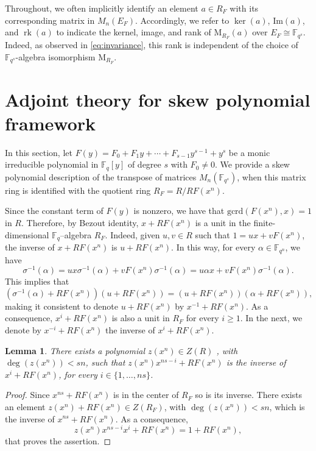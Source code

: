 \documentclass[a4paper, 11pt]{article}
\DeclareMathOperator{\rk}{rk}
\newtheorem{lemma}[theorem]{Lemma}
\newcommand{\F}{{\mathbb F}}
\newcommand{\gcrd}{\mathrm{gcrd}}
\newcommand{\Ima}{\mathrm{Im}}
\newcommand{\M}{\mathrm{M}}
\begin{document}
Throughout, we often implicitly identify an element $a \in R_F$ with its corresponding matrix in $M_n(E_F)$. Accordingly, we refer to $\ker(a)$, $\Ima(a)$, and $\rk(a)$ to indicate the kernel, image, and rank of $\M_{R_F}(a)$ over $E_F \cong \F_{q^s}$. Indeed, as observed in \eqref{eq:invariance}, this rank is independent of the choice of $\F_{q^s}$-algebra isomorphism $\M_{R_F}$.






\section{Adjoint theory for skew polynomial framework} \label{sec:adjoint}

In this section, let $F(y) = F_0 + F_1 y + \cdots + F_{s-1} y^{s-1} + y^s$ be  a monic irreducible polynomial in $\F_q[y]$ of degree $s$ with \(F_0 \neq 0\). We provide a skew polynomial description of the transpose of matrices $M_n(\F_{q^s})$, when this matrix ring is identified with the quotient ring $R_F = R/RF(x^n)$. 


Since the constant term of $F(y)$ is nonzero, we have that $\gcrd(F(x^n), x) = 1$ in $R$. Therefore, by Bezout identity, $x + R F(x^n)$ is a unit in the finite-dimensional \(\F_q\)--algebra $R_F$. Indeed, given \(u, v \in R\) such that \(1 = ux + vF(x^n)\), the inverse of \(x + RF(x^n)\) is \(u + RF(x^n)\). In this way, for every \(\alpha \in \F_{q^n}\), we have
\[
\sigma^{-1}(\alpha) = ux\sigma^{-1}(\alpha) + v F(x^n) \sigma^{-1}(\alpha) = u \alpha x + vF(x^n)\sigma^{-1}(\alpha).
\]
This implies that 
\begin{equation}\label{inverso}
(\sigma^{-1}(\alpha)+RF(x^n)) (u + RF(x^n)) = (u + RF(x^n))(\alpha + RF(x^n)),
\end{equation}
making it consistent to denote \(u + RF(x^n)\) by \(x^{-1} + RF(x^n)\). As a consequence, $x^i + R F(x^n)$ is also a unit in $R_F$ for every $i \geq 1$. In the next, we denote by $x^{-i}+RF(x^n)$ the inverse of $x^i+RF(x^n)$.

\begin{lemma} \label{lm:inverseofx}
    There exists a polynomial $z(x^n) \in Z(R)$ , with $\deg(z(x^n))<sn$, such that $z(x^n)x^{ns-i}+RF(x^n)$ is the inverse of $x^i+RF(x^n)$, for every $i \in \{1,\ldots,ns\}$.
\end{lemma}

\begin{proof}
    Since \(x^{ns} + RF(x^n)\) is in the center of \(R_F\) so is its inverse. There exists an element $z(x^n)+RF(x^n) \in Z(R_F)$, with $\deg(z(x^n))<sn$, which is the inverse of $x^{ns}+RF(x^n)$. As a consequence, 
    \[
    z(x^n)x^{ns-i}x^i+RF(x^n)=1+RF(x^n),
    \]
    that proves the assertion.
\end{proof}
\end{document}
